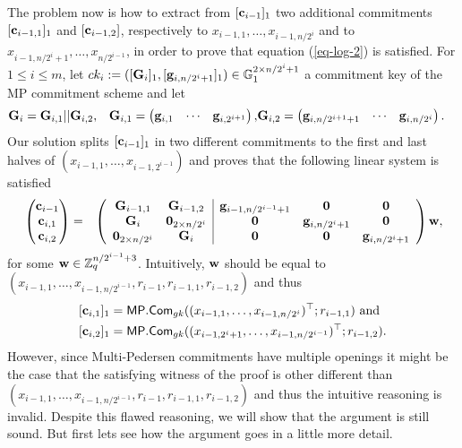 The problem now is how to extract from $[\mathbf{c}_{i-1}]_1$ two additional commitments $[\mathbf{c}_{i-1,1}]_1$ and $[\mathbf{c}_{i-1,2}]$, respectively to $x_{i-1,1},\ldots,x_{i-1,n/2^i}$ and to $x_{i-1,n/2^i+1},\ldots,x_{n/2^{i-1}}$, in order to prove that equation (\ref{eq-log-2}) is satisfied. For $1\leq i \leq m$, let $ck_i:=([\mathbf{{G}}_i]_1,[\mathbf{g}_{i,n/2^i+1}]_1)\in\mathbb{G}_1^{2\times{n/2^i+1}}$ a commitment key of the MP commitment scheme and let
\begin{align*}
&\mathbf{{G}}_i=\mathbf{{G}}_{i,1}||\mathbf{{G}}_{i,2},
&\mathbf{{G}}_{i,1}=
\begin{pmatrix}
    \mathbf{g}_{i,1}&\cdots&\mathbf{g}_{i,2^{i+1}}
\end{pmatrix},
&\mathbf{{G}}_{i,2}=
\begin{pmatrix}
    \mathbf{g}_{i,n/2^{i+1}+1}&\cdots&\mathbf{g}_{i,n/2^i}
\end{pmatrix}.
\end{align*}
Our solution splits $[\mathbf{c}_{i-1}]_1$ in two different commitments to the first and last halves of $(x_{i-1,1},\ldots,x_{i-1,2^{i-1}})$ and proves that the following linear system is satisfied
{\begin{align}
&\begin{pmatrix}
\mathbf{c}_{i-1}\\
\mathbf{c}_{i,1}\\
\mathbf{c}_{i,2}
\end{pmatrix}
=
&\left(\begin{array}{cc|ccc}
\mathbf{{G}}_{i-1,1}         & \mathbf{{G}}_{i-1,2}         & \mathbf{g}_{i-1,n/2^{i-1}+1} & \mathbf{0}             & \mathbf{0}\\
\mathbf{{G}}_{i}             & \mathbf{{0}}_{2\times n/2^i} & \mathbf{0}                   & \mathbf{g}_{i,n/2^i+1} & \mathbf{0} \\
\mathbf{{0}}_{2\times n/2^i} & \mathbf{{G}}_{i}             & \mathbf{0}                   & \mathbf{0}             & \mathbf{g}_{i,n/2^i+1}
\end{array}\right)
\mathbf{w},\label{eq-log-split}
\end{align}}%
for some $\mathbf{w}\in\mathbb{Z}_q^{n/2^{i-1}+3}$.
Intuitively, $\mathbf{w}$ should be equal to $(x_{i-1,1},\ldots,x_{i-1,n/2^{i-1}},\allowbreak r_{i-1},r_{i-1,1},r_{i-1,2})$ and thus 
\begin{align*}
&[\mathbf{c}_{i,1}]_1=\mathsf{MP}.\mathsf{Com}_{gk}(\allowbreak(x_{i-1,1},\ldots,x_{i-1,n/2^{i}})^\top;r_{i-1,1})\text{ and }\\
&[\mathbf{c}_{i,2}]_1=\mathsf{MP}.\mathsf{Com}_{gk}((x_{i-1,2^i+1},\ldots, x_{i-1,n/2^{i-1}})^\top;r_{i-1,2}).
\end{align*}
However, since Multi-Pedersen commitments have multiple openings it might be the case that the satisfying witness of the proof is other different than $(x_{i-1,1},\ldots,x_{i-1,n/2^{i-1}},r_{i-1},r_{i-1,1},r_{i-1,2})$ and thus the intuitive reasoning is invalid.
Despite this flawed reasoning, we will show that the argument is still sound. But first lets see how the argument goes in a little more detail.

